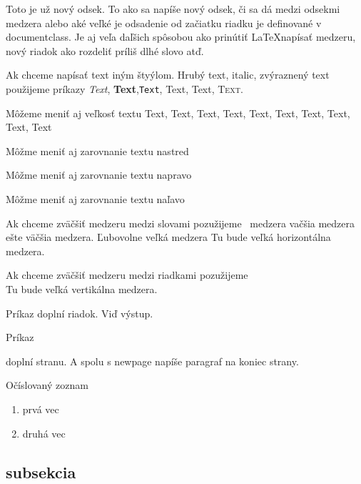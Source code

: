 \documentclass[11pt, a4paper]{article}
\begin{document}
Toto je už nový odsek. To ako sa napíše nový odsek, či sa dá medzi odsekmi medzera alebo aké veľké je odsadenie od začiatku riadku je definované v documentclass. Je aj veľa daľšich spôsobou ako prinútiť \LaTeX napísať medzeru, nový riadok ako rozdeliť príliš dlhé slovo atď.





Ak chceme napísať text iným štyýlom. Hrubý text, italic, zvýraznený text použijeme príkazy \emph{Text}, \textbf{Text},\texttt{Text}, \textrm{Text}, \textsf{Text}, \textsc{Text}.

Môžeme meniť aj veľkosť textu {\tiny Text}, {\scriptsize Text}, {\footnotesize	 Text}, {\small	 Text}, {\normalsize	 Text}, {\large	 Text}, {\Large	 Text}, {\LARGE	 Text}, {\huge	 Text}, {\Huge	 Text}

\begin{center}
Môžme meniť aj zarovnanie textu nastred
\end{center}

\begin{flushright}
Môžme meniť aj zarovnanie textu napravo
\end{flushright}

\begin{flushleft}
Môžme meniť aj zarovnanie textu naľavo
\end{flushleft}

Ak chceme zväčšiť medzeru medzi slovami pozužijeme \ medzera \quad vačšia medzera \qquad ešte väčšia medzera. Ľubovolne veľká medzera \hspace{1cm} Tu bude veľká horizontálna medzera.

Ak chceme zväčšiť medzeru medzi riadkami pozužijeme \vspace{1cm} \\ Tu bude veľká vertikálna medzera.

Príkaz \hfill doplní riadok. Viď výstup.

Príkaz

\vfill

doplní stranu. A spolu s newpage napíše paragraf na koniec strany.
\newpage

Očíslovaný zoznam
\begin{enumerate}
\item prvá vec
\item druhá vec
\end{enumerate}

\subsection{subsekcia}
\end{document}
